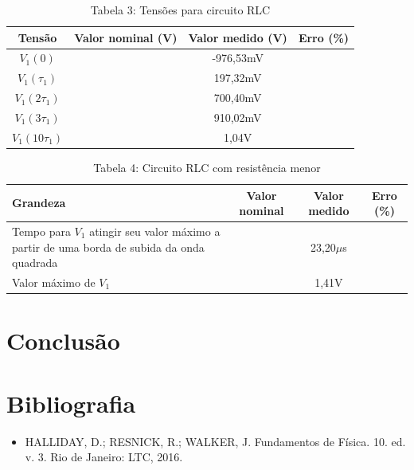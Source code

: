 \documentclass[a4 paper]{article}
\begin{document}
\vspace{5pt}
\begin{table}[h]
\centering
\begin{tabular}{|c|c|c|c|}
\hline
Tensão & Valor nominal (V) & Valor medido (V) & Erro (\%) \\\hline
$V_1(0)$ &  & -976,53mV & \\    \hline
$V_1(\tau_1)$ &  & 197,32mV & \\    \hline
$V_1(2\tau_1)$ &  & 700,40mV & \\\hline
$V_1(3\tau_1)$ &  & 910,02mV & \\\hline
$V_1(10\tau_1)$ &  & 1,04V & \\\hline
\end{tabular}
\caption*{Tabela 3: Tensões para circuito RLC}
\end{table}

\vspace{5pt}
\begin{table}[h]
\centering
\begin{tabular}{|p{5cm}|c|c|c|}
\hline
Grandeza & Valor nominal & Valor medido & Erro (\%) \\\hline
Tempo para $V_1$ atingir seu valor máximo a partir de uma borda de subida da onda quadrada &  & 23,20$\mu$s & \\    \hline
\centering Valor máximo de $V_1$ &  & 1,41V & \\    \hline
\end{tabular}
\caption*{Tabela 4: Circuito RLC com resistência menor}
\end{table}

\newpage
\section{Conclusão}

\section{Bibliografia}
\begin{itemize}
\item HALLIDAY, D.; RESNICK, R.; WALKER, J. Fundamentos de Física. 10. ed. v. 3. Rio de Janeiro: LTC, 2016.
\end{itemize}
\end{document}
